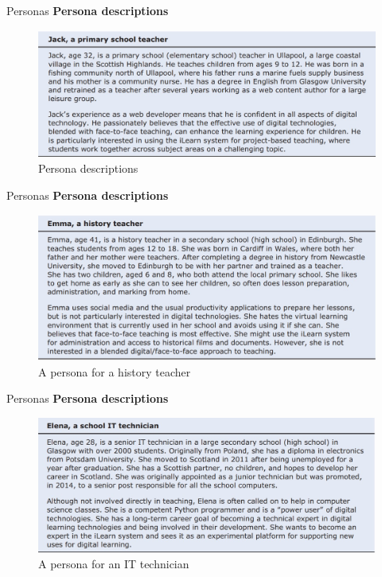 \documentclass{beamer}
\begin{document}
\begin{frame}{Personas}
	\textbf{Persona descriptions}
	\begin{figure}
		\includegraphics[scale=.5]{img/m2_20.jpg}
		\caption{Persona descriptions}
	\end{figure}
	
\end{frame}
\begin{frame}{Personas}
	\textbf{Persona descriptions}
	\begin{figure}
		\includegraphics[scale=.5]{img/m2_22.jpg}
		\caption{A persona for a history teacher}
	\end{figure}
	
\end{frame}
\begin{frame}{Personas}
	\textbf{Persona descriptions}
	\begin{figure}
		\includegraphics[scale=.5]{img/m2_23.jpg}
		\caption{A persona for an IT technician}
	\end{figure}
	
\end{frame}
\end{document}
